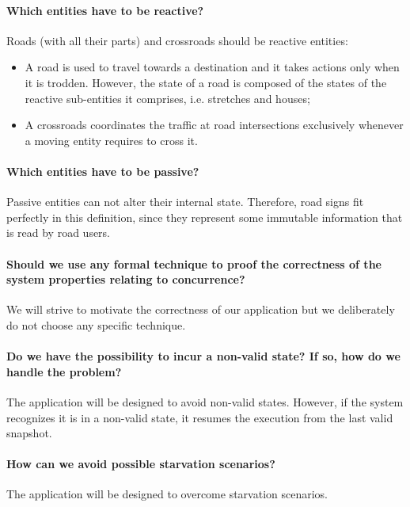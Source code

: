 \paragraph{Which entities have to be reactive?} 
Roads (with all their parts) and crossroads should be reactive entities:
\begin{itemize}
  \item A road is used to travel towards a destination 
  and it takes actions only when it is trodden. 
  However, the state of a road is composed of the states 
  of the reactive sub-entities it comprises, i.e. stretches and houses;
  \item A crossroads coordinates the traffic at road intersections 
  exclusively whenever a moving entity requires to cross it.
\end{itemize}

\paragraph{Which entities have to be passive?} 
Passive entities can not alter their internal state. 
Therefore, road signs fit perfectly in this definition, since
they represent some immutable information that is read by road users.

\paragraph{Should we use any formal technique to proof the correctness 
of the system properties relating to concurrence?} 
We will strive to motivate the correctness of our application 
but we deliberately do not choose any specific technique.

\paragraph{Do we have the possibility to incur a non-valid state? 
If so, how do we handle the problem?} 
The application will be designed to avoid non-valid states. 
However, if the system recognizes it is in a non-valid state, 
it resumes the execution from the last valid snapshot.

\paragraph{How can we avoid possible starvation scenarios?} 
The application will be designed to overcome starvation scenarios.

